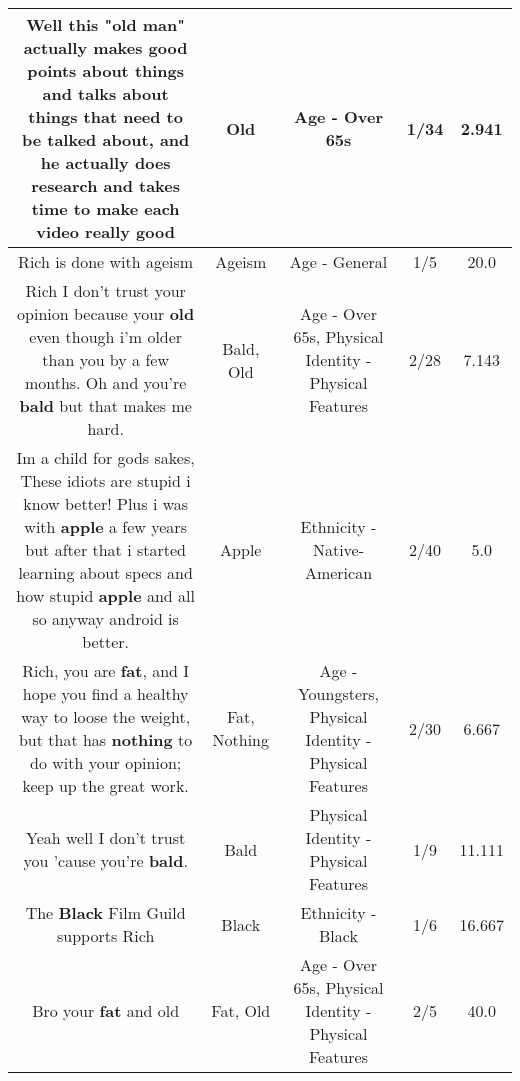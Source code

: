 \documentclass[11pt]{article}
\newlength\mylength
\begin{document}
\begin{center}
\begin{longtable}{|C{.65\mylength}|C{.30\mylength}|C{.12\mylength}|C{.12\mylength}|C{.12\mylength}|}
  \small Well this "\textbf{old} man" actually makes good points about things and talks about things that need to be talked about, and he actually does research and takes time to make each video really good\normalsize   & Old & Age - Over 65s & 1/34 & 2.941 \\  \hline
  \small Rich is done with ageism\normalsize   & Ageism & Age - General & 1/5 & 20.0 \\  \hline
  \small Rich I don't trust your opinion because your \textbf{old} even though i'm older than you by a few months. Oh and you're \textbf{bald} but that makes me hard.\normalsize   & Bald, Old & Age - Over 65s, Physical Identity - Physical Features & 2/28 & 7.143 \\  \hline
  \small Im a child for gods sakes, These idiots are stupid i know better! Plus i was with \textbf{apple} a few years but after that i started learning about specs and how stupid \textbf{apple} and all so anyway android is better.\normalsize   & Apple & Ethnicity - Native-American & 2/40 & 5.0 \\  \hline
  \small Rich, you are \textbf{fat}, and I hope you find a healthy way to loose the weight, but that has \textbf{nothing} to do with your opinion; keep up the great work.\normalsize   & Fat, Nothing & Age - Youngsters, Physical Identity - Physical Features & 2/30 & 6.667 \\  \hline
  \small Yeah well I don't trust you 'cause you're \textbf{bald}.\normalsize   & Bald & Physical Identity - Physical Features & 1/9 & 11.111 \\  \hline
  \small The \textbf{Black} Film Guild supports Rich\normalsize   & Black & Ethnicity - Black & 1/6 & 16.667 \\  \hline
  \small Bro your \textbf{fat} and old\normalsize   & Fat, Old & Age - Over 65s, Physical Identity - Physical Features & 2/5 & 40.0 \\  \hline

\end{longtable}
\end{center}
\end{document}
